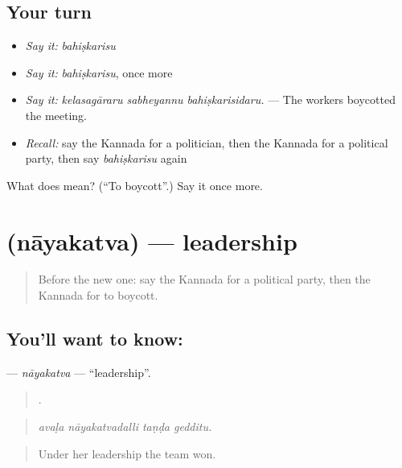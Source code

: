 \subsection*{Your turn}
\begin{itemize}
\raggedright
  \item \emph{Say it:} \emph{bahiṣkarisu}
  \item \emph{Say it:} \emph{bahiṣkarisu}, once more
  \item \emph{Say it:} \emph{kelasagāraru sabheyannu bahiṣkarisidaru.} — The workers boycotted the meeting.
  \item \emph{Recall:} say the Kannada for a politician, then the Kannada for a political party, then say \emph{bahiṣkarisu} again
\end{itemize}

\begin{tcolorbox}[breakable,colback=teal!4,colframe=teal!35!black,title={Before you move on}]
What does  mean? (\textquotedblleft{}To boycott\textquotedblright{}.) Say it once more.
\end{tcolorbox}
\section[\texorpdfstring{\kn{ನಾಯಕತ್ವ} (nāyakatva)}{ನಾಯಕತ್ವ (nāyakatva)}]{ (nāyakatva) — leadership}

\label{lesson:KA-C394-nayakatva}



\begin{quote}
Before the new one: say the Kannada for a political party, then the Kannada for to boycott.
\end{quote}

\subsection*{You'll want to know: }
\textbf{} — \emph{nāyakatva} — \textquotedblleft{}leadership\textquotedblright{}.

\begin{quote}
   .
\end{quote}

\begin{quote}
\emph{avaḷa nāyakatvadalli taṇḍa gedditu.}
\end{quote}

\begin{quote}
Under her leadership the team won.
\end{quote}

